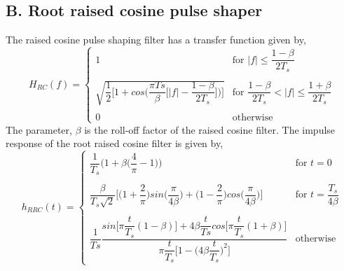 \begin{refsection}
\subsection*{B. Root raised cosine pulse shaper}
The raised cosine pulse shaping filter has a transfer function given by,
\begin{equation}
H_{RC}(f) = \begin{cases}
1 &\text{for $|f|\leq \dfrac{1-\beta}{2T_s}$}\\ \\
  \sqrt{\dfrac{1}{2} \bigg[1 + cos\bigg(\dfrac{\pi Ts}{\beta}\bigg[|f|- \dfrac{1-\beta}{2T_s} \bigg]\bigg)\bigg]} &\text{for $\dfrac{1-\beta}{2T_s}<|f|\leq\dfrac{1+\beta}{2T_s}$}\\ \\
0 & \text{otherwise}
\end{cases}
\end{equation}
The parameter, $\beta$ is the roll-off factor of the raised cosine filter. The impulse response of the root raised cosine filter is given by,
\begin{equation}
h_{RRC}(t) = \begin{cases}
	\dfrac{1}{T_s}\bigg(1+\beta\big(\dfrac{4}{\pi}-1\big)\bigg) &\text{for $t = 0$}\\ \\
	\dfrac{\beta}{T_s \sqrt{2}}\bigg[ \bigg(1+\dfrac{2}{\pi} \bigg) sin\bigg(\dfrac{\pi}{4 \beta}\bigg) + \bigg(1-\dfrac{2}{\pi} \bigg) cos\bigg(\dfrac{\pi}{4 \beta}\bigg)  \bigg]  	&\text{for $t=\dfrac{T_s}{4 \beta}$}\\ \\
	\dfrac{1}{Ts}\dfrac{sin \bigg[\pi\dfrac{t}{T_s}(1-\beta)\bigg] + 4\beta\dfrac{t}{Ts}cos \bigg[\pi\dfrac{t}{T_s}(1+\beta)\bigg] }{\pi\dfrac{t}{T_s}\bigg[1-\bigg(4\beta \dfrac{t}{T_s}\bigg)^2\bigg]} & \text{otherwise}
\end{cases}
\end{equation}


\end{refsection}
